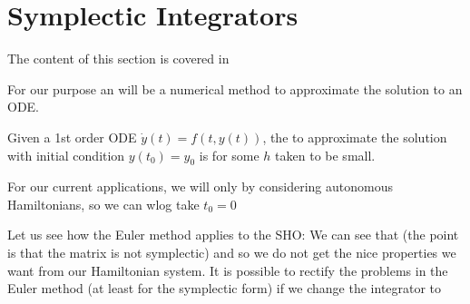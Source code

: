 \documentclass{article}
\begin{document}
\section{Symplectic Integrators}

\begin{remark}
	The content of this section is covered in \cite{Yoshida1992}
\end{remark}

For our purpose an  will be a numerical method to approximate the solution to an ODE. 

\begin{definition}
	Given a 1st order ODE $\dot{y}(t) = f(t,y(t))$, the  to approximate the solution with initial condition $y(t_0)=y_0$ is 
for some $h$ taken to be small. 
\end{definition}

\begin{remark}
	For our current applications, we will only by considering autonomous Hamiltonians, so we can wlog take $t_0=0$ 
\end{remark}

\begin{example}
	Let us see how the Euler method applies to the SHO:
We can see that 
(the point is that the matrix is not symplectic) and so we do not get the nice properties we want from our Hamiltonian system. It is possible to rectify the problems in the Euler method (at least for the symplectic form) if we change the integrator to 
\end{example}
\end{document}
